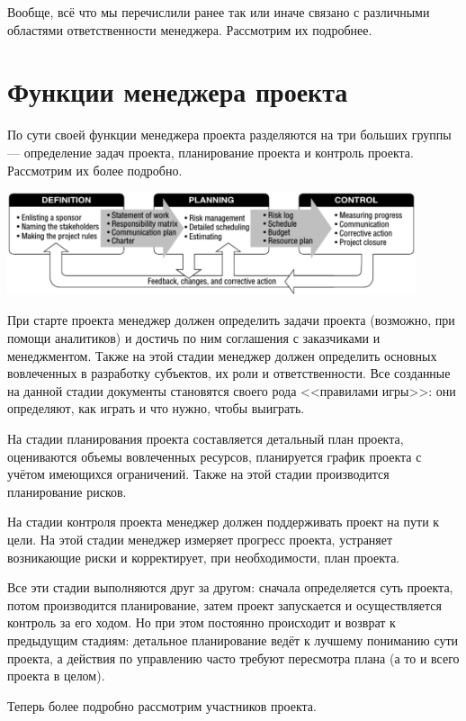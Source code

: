 \documentclass{../../text-style}
\begin{document}
Вообще, всё что мы перечислили ранее так или иначе связано с различными областями ответственности менеджера. Рассмотрим их подробнее.

\section{Функции менеджера проекта}

По сути своей функции менеджера проекта разделяются на три больших группы --- определение задач проекта, планирование проекта и контроль проекта. Рассмотрим их более подробно.

\begin{center}
    \includegraphics[width=0.9\textwidth]{projectManagerFunctions.png}
\end{center}

При старте проекта менеджер должен определить задачи проекта (возможно, при помощи аналитиков) и достичь по ним соглашения с заказчиками и менеджментом. Также на этой стадии менеджер должен определить основных вовлеченных в разработку субъектов, их роли и ответственности. Все созданные на данной стадии документы становятся своего рода <<правилами игры>>: они определяют, как играть и что нужно, чтобы выиграть.

На стадии планирования проекта составляется детальный план проекта, оцениваются объемы вовлеченных ресурсов, планируется график проекта с учётом имеющихся ограничений. Также на этой стадии производится планирование рисков.

На стадии контроля проекта менеджер должен поддерживать проект на пути к цели. На этой стадии менеджер измеряет прогресс проекта, устраняет возникающие риски и корректирует, при необходимости, план проекта.

Все эти стадии выполняются друг за другом: сначала определяется суть проекта, потом производится планирование, затем проект запускается и осуществляется контроль за его ходом. Но при этом постоянно происходит и возврат к предыдущим стадиям: детальное планирование ведёт к лучшему пониманию сути проекта, а действия по управлению часто требуют пересмотра плана (а то и всего проекта в целом).

Теперь более подробно рассмотрим участников проекта.
\end{document}

